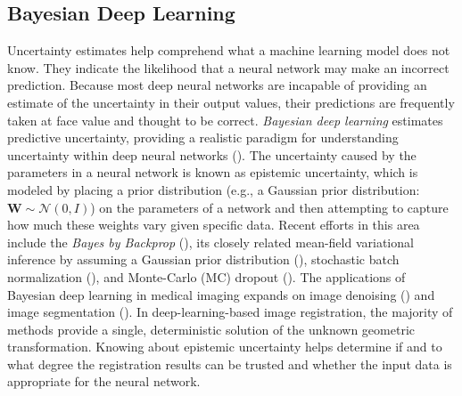 \documentclass[times,twocolumn,final]{elsarticle}
\begin{document}
\subsection{Bayesian Deep Learning}
Uncertainty estimates help comprehend what a machine learning model does not know. They indicate the likelihood that a neural network may make an incorrect prediction. Because most deep neural networks are incapable of providing an estimate of the uncertainty in their output values, their predictions are frequently taken at face value and thought to be correct. \textit{Bayesian deep learning} estimates predictive uncertainty, providing a realistic paradigm for understanding uncertainty within deep neural networks (\cite{gal2016dropout}). The uncertainty caused by the parameters in a neural network is known as epistemic uncertainty, which is modeled by placing a prior distribution (e.g., a Gaussian prior distribution: $\mathbf{W}\sim \mathcal{N}(0,I)$) on the parameters of a network and then attempting to capture how much these weights vary given specific data. Recent efforts in this area include the \textit{Bayes by Backprop} (\cite{blundell2015weight}), its closely related mean-field variational inference by assuming a Gaussian prior distribution (\cite{Tolle2021}), stochastic batch normalization (\cite{atanov2018uncertainty}), and Monte-Carlo (MC) dropout (\cite{gal2016dropout, Kendall2017}). The applications of Bayesian deep learning in medical imaging expands on image denoising (\cite{Tolle2021, Laves2020}) and image segmentation (\cite{devries2018leveraging, baumgartner2019phiseg, mehrtash2020confidence}). In deep-learning-based image registration, the majority of methods provide a single, deterministic solution of the unknown geometric transformation. Knowing about epistemic uncertainty helps determine if and to what degree the registration results can be trusted and whether the input data is appropriate for the neural network. 
\end{document}

